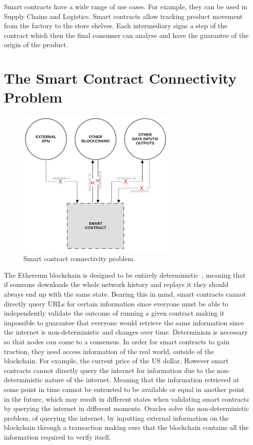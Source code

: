 Smart contracts have a wide range of use cases. For example, they can be used in Supply Chains and Logistics. Smart contracts allow tracking product movement from the factory to the store shelves. Each intermediary signs a step of the contract which then the final consumer can analyse and have the guarantee of the origin of the product.

\section{The Smart Contract Connectivity Problem}

\begin{figure}[H]
  \begin{center}
    \leavevmode
    \includegraphics[width=0.7\textwidth]{figures/sc_connectivity.jpg}
    \caption{Smart contract connectivity problem.}
    \label{fig:/figures/sc_connectivity.jpg}
  \end{center}
\end{figure}

The Ethereum blockchain is designed to be entirely deterministic~\citet{GavinWood2014}, meaning that if someone downloads the whole network history and replays it they should always end up with the same state. Bearing this in mind, smart contracts cannot directly query URLs for certain information since everyone must be able to independently validate the outcome of running a given contract making it impossible to guarantee that everyone would retrieve the same information since the internet is non-deterministic and changes over time. Determinism is necessary so that nodes can come to a consensus. In order for smart contracts to gain traction, they need access information of the real world, outside of the blockchain. For example, the current price of the US dollar. However smart contracts cannot directly query the internet for information due to the non-deterministic nature of the internet. Meaning that the information retrieved at some point in time cannot be entrusted to be available or equal in another point in the future, which may result in different states when validating smart contracts by querying the internet in different moments. Oracles solve the non-deterministic problem, of querying the internet, by inputting external information on the blockchain through a transaction making sure that the blockchain contains all the information required to verify itself.


